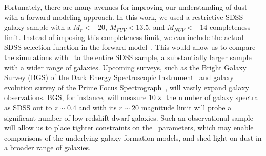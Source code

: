 Fortunately, there are many avenues for improving our understanding of dust
with a forward modeling approach. 
In this work, we used a restrictive SDSS galaxy sample with a $M_r < -20$,
$M_{FUV} < 13.5$, and $M_{NUV} < -14$ completeness limit. 
Instead of imposing this completeness limit, we can include the actual SDSS
selection function in the forward 
model~\citep[\eg~][]{dickey2020}. 
This would allow us to compare the simulations with \eda~to the entire SDSS
sample, a substantially larger sample with a wider range of galaxies. 
Upcoming surveys, such as the Bright Galaxy Survey (BGS) of the Dark Energy
Spectroscopic Instrument~\citep[DESI;][]{desicollaboration2016, ruiz-macias2020} 
and galaxy evolution survey of the Prime Focus
Spectrograph~\citep[PFS;][]{takada2014,tamura2016}, will vastly expand galaxy
observations. 
BGS, for instance, will measure $10\times$ the number of galaxy spectra as
SDSS out to $z\sim0.4$  and with its $r\sim20$ magnitude limit will probe
a significant number of low redshift dwarf galaxies. 
Such an observational sample will allow us to place tighter constraints on
the \eda~parameters, which may enable comparisons of the underlying galaxy
formation models, and shed light on dust in a broader range of galaxies.
    
